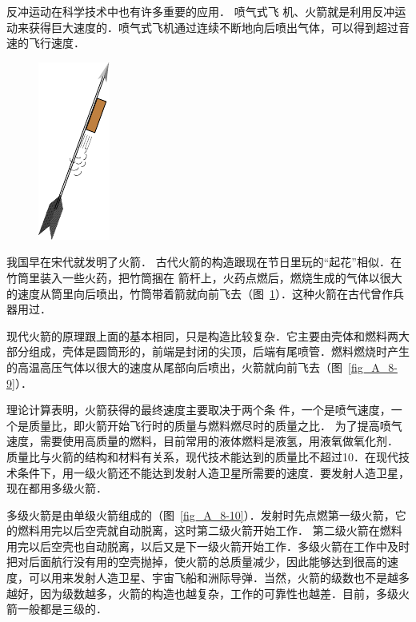 反冲运动在科学技术中也有许多重要的应用．
喷气式飞
机、火箭就是利用反冲运动来获得巨大速度的．喷气式飞机通过连续不断地向后喷出气体，可以得到超过音速的飞行速度．
\begin{figure}[htbp]
    \centering
    \includegraphics{fig/A/8-8.pdf}
    \caption{}\label{fig_A_8-8}
\end{figure}

我国早在宋代就发明了火箭．
古代火箭的构造跟现在节日里玩的“起花”相似．在竹筒里装入一些火药，把竹筒捆在
箭杆上，火药点燃后，燃烧生成的气体以很大的速度从筒里向后喷出，竹筒带着箭就向前飞去（图~\ref{fig_A_8-8}）．这种火箭在古代曾作兵器用过．

现代火箭的原理跟上面的基本相同，只是构造比较复杂．它主要由壳体和燃料两大部分组成，壳体是圆筒形的，前端是封闭的尖顶，后端有尾喷管．燃料燃烧时产生的高温高压气体以很大的速度从尾部向后喷出，火箭就向前飞去（图~\ref{fig_A_8-9}）．

理论计算表明，火箭获得的最终速度主要取决于两个条
件，一个是喷气速度，一个是质量比，即火箭开始飞行时的质量与燃料燃尽时的质量之比．
为了提高喷气速度，需要使用高质量的燃料，目前常用的液体燃料是液氢，用液氧做氧化剂．
质量比与火箭的结构和材料有关系，现代技术能达到的质量比不超过10．在现代技术条件下，用一级火箭还不能达到发射人造卫星所需要的速度．要发射人造卫星，现在都用多级火箭．

多级火箭是由单级火箭组成的（图~\ref{fig_A_8-10}）．发射时先点燃第一级火箭，它的燃料用完以后空壳就自动脱离，这时第二级火箭开始工作．
第二级火箭在燃料用完以后空壳也自动脱离，以后又是下一级火箭开始工作．多级火箭在工作中及时把对后面航行没有用的空壳抛掉，使火箭的总质量减少，因此能够达到很高的速度，可以用来发射人造卫星、宇宙飞船和洲际导弹．当然，火箭的级数也不是越多越好，因为级数越多，火箭的构造也越复杂，工作的可靠性也越差．目前，多级火箭一般都是三级的．

